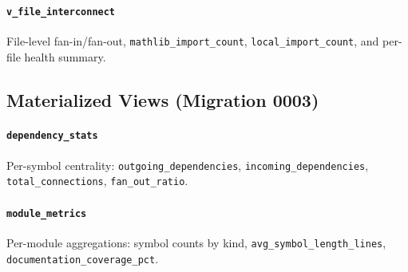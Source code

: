 \paragraph{\texttt{v\_file\_interconnect}} File-level fan-in/fan-out,
\texttt{mathlib\_import\_count}, \texttt{local\_import\_count}, and per-file
health summary.

\subsection{Materialized Views (Migration 0003)}

\paragraph{\texttt{dependency\_stats}} Per-symbol centrality:
\texttt{outgoing\_dependencies}, \texttt{incoming\_dependencies},
\texttt{total\_connections}, \texttt{fan\_out\_ratio}.

\paragraph{\texttt{module\_metrics}} Per-module aggregations: symbol counts by
kind, \texttt{avg\_symbol\_length\_lines}, \texttt{documentation\_coverage\_pct}.
